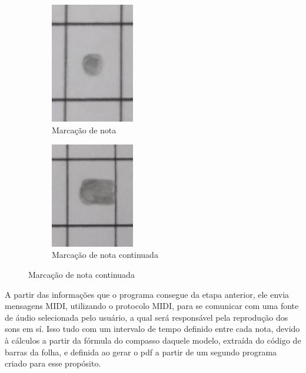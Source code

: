 \documentclass[12pt]{report}
\begin{document}
\begin{figure}[H]
  \centering
  \begin{subfigure}{0.4\textwidth}
    \centering
    \includegraphics[width=0.4\textwidth]{imagens/nota.jpg}
    \caption{Marcação de nota}
    \label{fig:marcacao}
  \end{subfigure}
  \begin{subfigure}{0.4\textwidth}
    \centering
    \includegraphics[width=0.4\textwidth]{imagens/nota_continuada.jpeg}
    \caption{Marcação de nota continuada}
    \label{fig:marcacao_continuada}
  \end{subfigure}%
\end{figure}

A partir das informações que o programa consegue da etapa anterior, ele envia mensagens MIDI, utilizando o protocolo MIDI, para se comunicar com uma fonte de áudio selecionada pelo usuário, a qual será responsável pela reprodução dos sons em sí. Isso tudo com um intervalo de tempo definido entre cada nota, devido à cálculos a partir da fórmula do compasso daquele modelo, extraída do código de barras da folha, e definida ao gerar o pdf a partir de um segundo programa criado para esse propósito.
\end{document}
